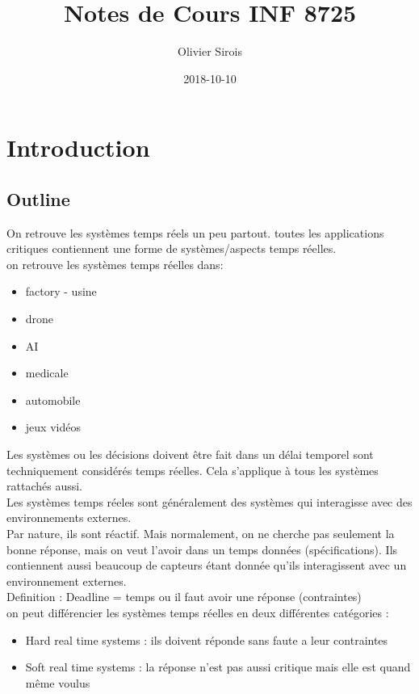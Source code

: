 \documentclass[oneside]{book}
\title{Notes de Cours INF 8725}
\date{2018-10-10}
\author{Olivier Sirois}
\begin{document}
    \setcounter{page}{1}
    \maketitle
    \tableofcontents
    \chapter*{Introduction}
    
    \section[Info]{Outline}
    On retrouve les systèmes temps réels un peu partout. toutes les applications critiques contiennent une forme de systèmes/aspects temps réelles.\\
    
    on retrouve les systèmes temps réelles dans:
    \begin{itemize}
        \item factory - usine
        \item drone
        \item AI
        \item medicale
        \item automobile
        \item jeux vidéos
    \end{itemize}

    Les systèmes ou les décisions doivent être fait dans un délai temporel sont techniquement considérés temps réelles. Cela s'applique à tous les systèmes rattachés aussi.\\
    
    Les systèmes temps réeles sont généralement des systèmes qui interagisse avec des environnements externes.\\
    
    Par nature, ils sont réactif. Mais normalement, on ne cherche pas seulement la bonne réponse, mais on veut l'avoir dans un temps données (spécifications). Ils contiennent aussi beaucoup de capteurs étant donnée qu'ils interagissent avec un environnement externes.\\
    
    Definition : Deadline  = temps ou il faut avoir une réponse (contraintes)\\
    
    on peut différencier les systèmes temps réelles en deux différentes catégories :
    \begin{itemize}
        \item Hard real time systems : ils doivent réponde sans faute a leur contraintes
        \item Soft real time systems : la réponse n'est pas aussi critique mais elle est quand même voulus
    \end{itemize}
       
\end{document}
